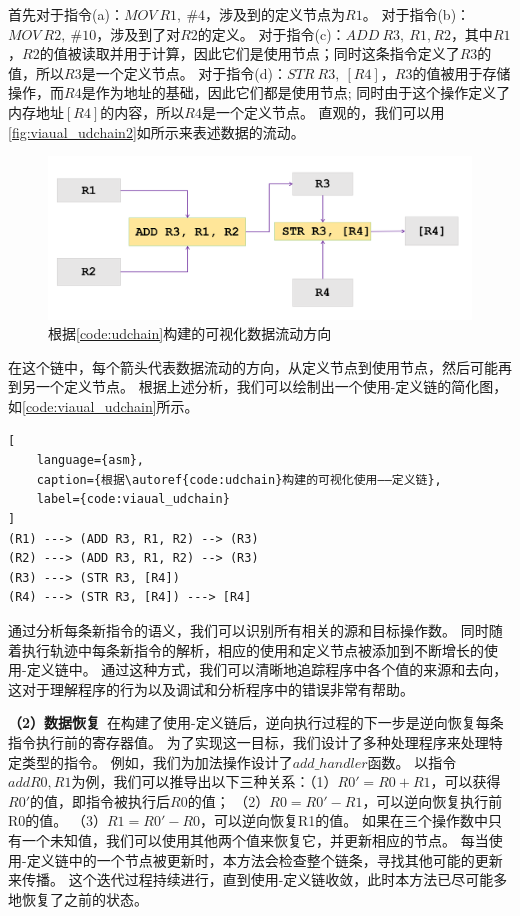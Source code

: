 首先对于指令(a)：$MOV\ R1,\ \#4$，涉及到的定义节点为$R1$。
对于指令(b)：$MOV\ R2,\ \#10$，涉及到了对$R2$的定义。
对于指令(c)：$ADD\ R3,\ R1, R2$，其中$R1$，$R2$的值被读取并用于计算，因此它们是使用节点；同时这条指令定义了$R3$的值，所以$R3$是一个定义节点。
对于指令(d)：$STR\ R3,\ [R4]$，$R3$的值被用于存储操作，而$R4$是作为地址的基础，因此它们都是使用节点;
同时由于这个操作定义了内存地址$[R4]$的内容，所以$R4$是一个定义节点。
直观的，我们可以用\autoref{fig:viaual_udchain2}如所示来表述数据的流动。
\begin{figure}[h]
    \centering
    \includegraphics[width=1.0\textwidth]{./figure/UD-visual.png}
    \caption{根据\autoref{code:udchain}构建的可视化数据流动方向}
    \label{fig:viaual_udchain2}
\end{figure}
在这个链中，每个箭头代表数据流动的方向，从定义节点到使用节点，然后可能再到另一个定义节点。
根据上述分析，我们可以绘制出一个使用-定义链的简化图，如\autoref{code:viaual_udchain}所示。

\begin{lstlisting}[
    language={asm},
    caption={根据\autoref{code:udchain}构建的可视化使用——定义链},
    label={code:viaual_udchain}
]
(R1) ---> (ADD R3, R1, R2) --> (R3)
(R2) ---> (ADD R3, R1, R2) --> (R3)
(R3) ---> (STR R3, [R4])
(R4) ---> (STR R3, [R4]) ---> [R4]
\end{lstlisting}

通过分析每条新指令的语义，我们可以识别所有相关的源和目标操作数。
同时随着执行轨迹中每条新指令的解析，相应的使用和定义节点被添加到不断增长的使用-定义链中。
通过这种方式，我们可以清晰地追踪程序中各个值的来源和去向，这对于理解程序的行为以及调试和分析程序中的错误非常有帮助。

\textbf{（2）数据恢复}\ 在构建了使用-定义链后，逆向执行过程的下一步是逆向恢复每条指令执行前的寄存器值。
为了实现这一目标，我们设计了多种处理程序来处理特定类型的指令。
例如，我们为加法操作设计了$add\_handler$函数。
以指令$add R0, R1$为例，我们可以推导出以下三种关系：（1）$R0'=R0+R1$，可以获得$R0'$的值，即指令被执行后$R0$的值；
（2）$R0=R0'-R1$，可以逆向恢复执行前R0的值。
（3）$R1=R0'-R0$，可以逆向恢复R1的值。
如果在三个操作数中只有一个未知值，我们可以使用其他两个值来恢复它，并更新相应的节点。
每当使用-定义链中的一个节点被更新时，本方法会检查整个链条，寻找其他可能的更新来传播。
这个迭代过程持续进行，直到使用-定义链收敛，此时本方法已尽可能多地恢复了之前的状态。


